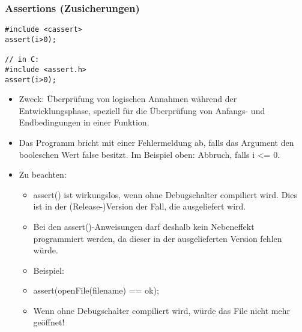 \subsubsection{Assertions (Zusicherungen)}
\begin{minipage}{0.25\linewidth}
\begin{lstlisting}
#include <cassert>
assert(i>0);

// in C:
#include <assert.h>
assert(i>0);
\end{lstlisting}
\end{minipage}%
\begin{minipage}{0.75\linewidth}
\begin{itemize}
	\item Zweck: Überprüfung von logischen Annahmen während der Entwicklungsphase, speziell für die Überprüfung von Anfangs- und Endbedingungen in einer Funktion.
	\item Das Programm bricht mit einer Fehlermeldung ab, falls das Argument den booleschen Wert false besitzt. Im Beispiel oben: Abbruch, falls i <= 0.
	\item Zu beachten:
	\begin{itemize}
		\item assert() ist wirkungslos, wenn ohne Debugschalter compiliert wird. Dies ist in der (Release-)Version der Fall, die ausgeliefert wird.
		\item Bei den assert()-Anweisungen darf deshalb kein Nebeneffekt programmiert werden, da dieser in der ausgelieferten Version fehlen würde.
		\item Beispiel:
		\item[\-] assert(openFile(filename) == ok);
		\item[\-] Wenn ohne Debugschalter compiliert wird, würde das File nicht mehr geöffnet!
	\end{itemize}
\end{itemize}
\end{minipage}
